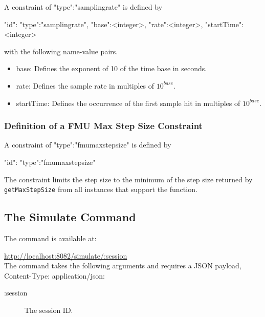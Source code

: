 	A constraint of {\ttfamily "type":"samplingrate"} is defined by
	
	\begin{json}
		"id":{
			"type":"samplingrate",
			"base":<integer>,
			"rate":<integer>,
			"startTime":<integer>
		} 
	\end{json}
	
	\noindent with the following name-value pairs.
	
	\begin{itemize}
		\item {\ttfamily base:} Defines the exponent of 10 of the time base in seconds.
		\item {\ttfamily rate:} Defines the sample rate in multiples of $10^{base}$.
		\item	{\ttfamily startTime:} Defines the occurrence of the first sample hit in multiples of $10^{base}$.
	\end{itemize}
	
	\subsubsection{Definition of a FMU Max Step Size Constraint}\label{sec:fmumaxstepsize}
	
	A constraint of {\ttfamily "type":"fmumaxstepsize"} is defined by
	
	\begin{json}
		"id":{
			"type":"fmumaxstepsize"
		} 
	\end{json}
	
	\noindent The constraint limits the step size to the minimum of the step size returned by \texttt{getMaxStepSize} from all instances that support the function.
	
	
	\subsection{The Simulate Command}
	
	The command is available at:
	
	\url{http://localhost:8082/simulate/:session}\\
	
	\noindent The command takes the following arguments and requires a JSON payload, Content-Type: application/json:
	
	\begin{description}
		\item[:session] The session ID.
	\end{description}
	
